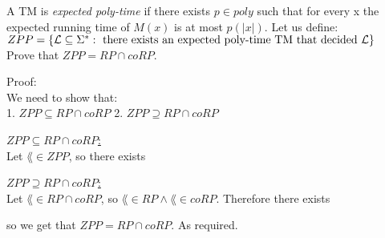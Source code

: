 A TM is {\it expected poly-time } if there exists $p \in poly$ such that for every x the
expected running time of $M(x)$ is at most $p(|x|)$.
Let us define: \\
$ZPP = \{\mathcal{L} \subseteq \Sigma^*: \text{ there exists an expected poly-time TM that decided } \mathcal{L}\}$ \\
Prove that $ZPP = RP \cap coRP$.

Proof: \\
We need to show that: \\
1. $ZPP \subseteq RP \cap coRP$
2. $ZPP \supseteq RP \cap coRP$

\underline{$ZPP \subseteq RP \cap coRP$:} \\
Let $\lang \in ZPP$, so there exists



\underline{$ZPP \supseteq RP \cap coRP$:} \\
Let $\lang \in RP \cap coRP$, so $\lang \in RP \wedge \lang \in coRP$. Therefore there exists



so we get that $ZPP = RP \cap coRP$. As required.
